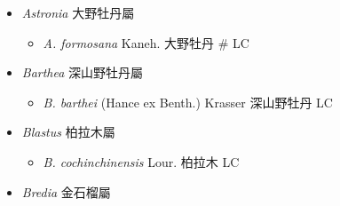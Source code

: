 
  \begin{itemize}
 \item[] \textit{Astronia} 大野牡丹屬
                                
  \begin{itemize}
        \item[] \textit{A. formosana} Kaneh.  大野牡丹  \# LC
  \end{itemize}
 \item[] \textit{Barthea} 深山野牡丹屬
                                
  \begin{itemize}
        \item[] \textit{B. barthei} (Hance ex Benth.) Krasser  深山野牡丹   LC
  \end{itemize}
 \item[] \textit{Blastus} 柏拉木屬
                                
  \begin{itemize}
        \item[] \textit{B. cochinchinensis} Lour.  柏拉木   LC
  \end{itemize}
 \item[] \textit{Bredia} 金石榴屬
                                

\end{itemize}
